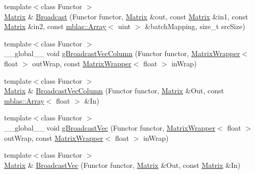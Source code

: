 \begin{DoxyCompactItemize}
{\footnotesize template$<$class Functor $>$ }\\\hyperlink{namespaceamunmt_1_1GPU_1_1mblas_ab67821a8254de53e45a623cf73c0aef6}{Matrix} \& \hyperlink{namespaceamunmt_1_1GPU_1_1mblas_afba17f6f1ebd7b942ed07d760259d143}{Broadcast} (Functor functor, \hyperlink{namespaceamunmt_1_1GPU_1_1mblas_ab67821a8254de53e45a623cf73c0aef6}{Matrix} \&out, const \hyperlink{namespaceamunmt_1_1GPU_1_1mblas_ab67821a8254de53e45a623cf73c0aef6}{Matrix} \&in1, const \hyperlink{namespaceamunmt_1_1GPU_1_1mblas_ab67821a8254de53e45a623cf73c0aef6}{Matrix} \&in2, const \hyperlink{classamunmt_1_1GPU_1_1mblas_1_1Array}{mblas\+::\+Array}$<$ uint $>$ \&batch\+Mapping, size\+\_\+t src\+Size)
\item 
{\footnotesize template$<$class Functor $>$ }\\\+\_\+\+\_\+global\+\_\+\+\_\+ void \hyperlink{namespaceamunmt_1_1GPU_1_1mblas_abb917582af813cef1c2292204dbf327b}{g\+Broadcast\+Vec\+Column} (Functor functor, \hyperlink{classamunmt_1_1GPU_1_1mblas_1_1MatrixWrapper}{Matrix\+Wrapper}$<$ float $>$ out\+Wrap, const \hyperlink{classamunmt_1_1GPU_1_1mblas_1_1MatrixWrapper}{Matrix\+Wrapper}$<$ float $>$ in\+Wrap)
\item 
{\footnotesize template$<$class Functor $>$ }\\\hyperlink{namespaceamunmt_1_1GPU_1_1mblas_ab67821a8254de53e45a623cf73c0aef6}{Matrix} \& \hyperlink{namespaceamunmt_1_1GPU_1_1mblas_a468e534364a213f40977fad2c8ce6024}{Broadcast\+Vec\+Column} (Functor functor, \hyperlink{namespaceamunmt_1_1GPU_1_1mblas_ab67821a8254de53e45a623cf73c0aef6}{Matrix} \&Out, const \hyperlink{classamunmt_1_1GPU_1_1mblas_1_1Array}{mblas\+::\+Array}$<$ float $>$ \&In)
\item 
{\footnotesize template$<$class Functor $>$ }\\\+\_\+\+\_\+global\+\_\+\+\_\+ void \hyperlink{namespaceamunmt_1_1GPU_1_1mblas_ac798f85afe19741e1c3bc34d516d6545}{g\+Broadcast\+Vec} (Functor functor, \hyperlink{classamunmt_1_1GPU_1_1mblas_1_1MatrixWrapper}{Matrix\+Wrapper}$<$ float $>$ out\+Wrap, const \hyperlink{classamunmt_1_1GPU_1_1mblas_1_1MatrixWrapper}{Matrix\+Wrapper}$<$ float $>$ in\+Wrap)
\item 
{\footnotesize template$<$class Functor $>$ }\\\hyperlink{namespaceamunmt_1_1GPU_1_1mblas_ab67821a8254de53e45a623cf73c0aef6}{Matrix} \& \hyperlink{namespaceamunmt_1_1GPU_1_1mblas_ace73de50c8241f219ad490d64513829f}{Broadcast\+Vec} (Functor functor, \hyperlink{namespaceamunmt_1_1GPU_1_1mblas_ab67821a8254de53e45a623cf73c0aef6}{Matrix} \&Out, const \hyperlink{namespaceamunmt_1_1GPU_1_1mblas_ab67821a8254de53e45a623cf73c0aef6}{Matrix} \&In)

\end{DoxyCompactItemize}
